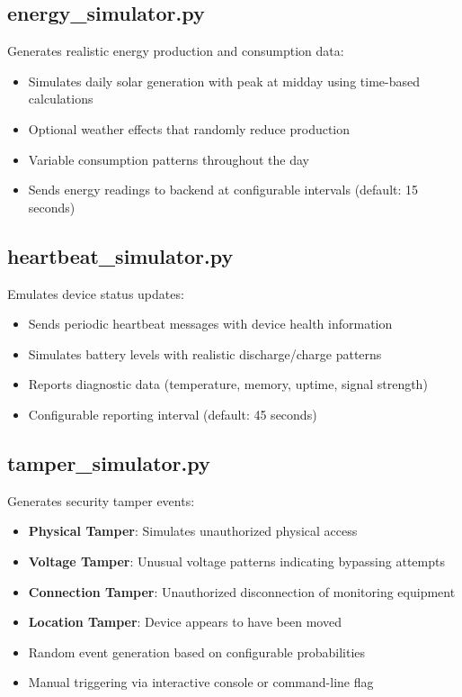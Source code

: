 \documentclass[
]{elteikthesis}[2024/04/26]
\begin{document}
\subsection{energy\_simulator.py}
Generates realistic energy production and consumption data:
\begin{itemize}
    \item Simulates daily solar generation with peak at midday using time-based calculations
    \item Optional weather effects that randomly reduce production
    \item Variable consumption patterns throughout the day
    \item Sends energy readings to backend at configurable intervals (default: 15 seconds)
\end{itemize}

\subsection{heartbeat\_simulator.py}
Emulates device status updates:
\begin{itemize}
    \item Sends periodic heartbeat messages with device health information
    \item Simulates battery levels with realistic discharge/charge patterns
    \item Reports diagnostic data (temperature, memory, uptime, signal strength)
    \item Configurable reporting interval (default: 45 seconds)
\end{itemize}

\subsection{tamper\_simulator.py}
Generates security tamper events:
\begin{itemize}
    \item \textbf{Physical Tamper}: Simulates unauthorized physical access
    \item \textbf{Voltage Tamper}: Unusual voltage patterns indicating bypassing attempts
    \item \textbf{Connection Tamper}: Unauthorized disconnection of monitoring equipment
    \item \textbf{Location Tamper}: Device appears to have been moved
    \item Random event generation based on configurable probabilities
    \item Manual triggering via interactive console or command-line flag
\end{itemize}
\end{document}
